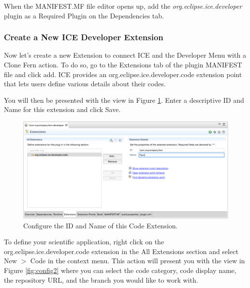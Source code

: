 \documentclass{article}
\begin{document}
When the MANIFEST.MF file editor opens up, add the
\emph{org.eclipse.ice.developer} plugin as a Required Plugin on the Dependencies
tab.

\subsubsection*{Create a New ICE Developer Extension}
Now let's create a new Extension to connect ICE and the Developer Menu
with a Clone Fern action. To do so, go to the Extensions tab of the
plugin MANIFEST file and click add. ICE provides an
org.eclipse.ice.developer.code extension point that lets users define various
details about their codes. 

You will then be presented with the view in Figure \ref{fig:config1}. Enter a
descriptive ID and Name for this extension and click Save. 
\begin{figure}[h]
\includegraphics[width=\textwidth]{figures/extptconfig1.png}
\caption{Configure the ID and Name of this Code Extension.}
\label{fig:config1}
\end{figure}

To define your scientific application, right click on the
org.eclipse.ice.developer.code extension in the All Extensions section and
select New $>$ Code in the context menu. This action will present you with the
view in Figure \ref{fig:config2} where you can select the code category, code
display name, the repository URL, and the branch you would like to work with. 
\end{document}
